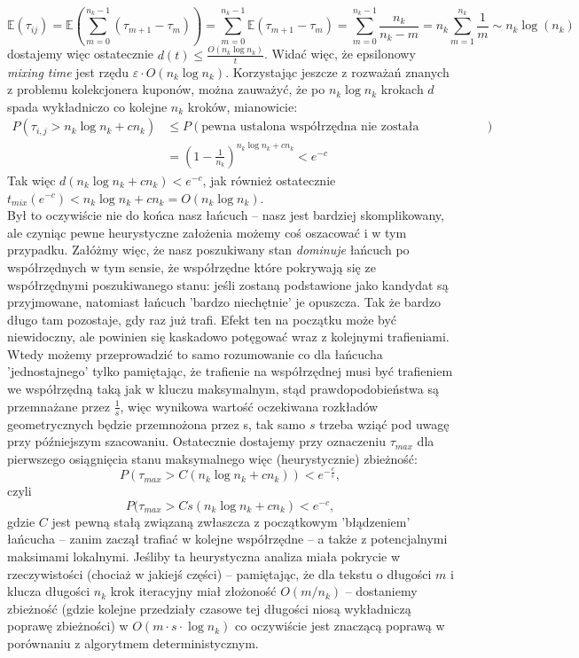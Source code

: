 \documentclass[a4paper]{article}
\theoremstyle{defn}
\theoremstyle{theorem}
\theoremstyle{lemma}
\theoremstyle{cor}
\theoremstyle{fact}
\begin{document}
$$\mathbb{E}(\tau_{ij}) = \mathbb{E}(\sum\limits_{m=0}^{n_k - 1} (\tau_{m+1} - \tau_m)) = \sum\limits_{m=0}^{n_k - 1} \mathbb{E}(\tau_{m+1} - \tau_m) = \sum\limits_{m=0}^{n_k - 1} \frac{n_k}{n_k - m} = n_k \sum\limits_{m=1}^{n_k} \frac{1}{m} \sim n_k \log(n_k)$$
dostajemy więc ostatecznie $d(t) \leq \frac{O(n_k \log n_k)}{t}$. Widać więc, że epsilonowy \textit{mixing time} jest rzędu $\varepsilon \cdot O(n_k \log n_k)$. Korzystając jeszcze z rozważań znanych z problemu kolekcjonera kuponów, można zauważyć, że po $n_k \log n_k$ krokach $d$ spada wykładniczo co kolejne $n_k$ kroków, mianowicie:
\begin{align*}
    P(\tau_{i,j} > n_k \log n_k + cn_k) &\leq P(\text{pewna ustalona współrzędna nie została odwiedzona})\\
    &= (1-\frac{1}{n_k})^{n_k \log n_k + cn_k} < e^{-c}
\end{align*}
Tak więc $d(n_k \log n_k + cn_k) < e^{-c}$, jak również ostatecznie $t_{mix}(e^{-c}) < n_k \log n_k + cn_k = O(n_k \log n_k)$. \\
Był to oczywiście nie do końca nasz łańcuch – nasz jest bardziej skomplikowany, ale czyniąc pewne heurystyczne założenia możemy coś oszacować i w tym przypadku. Załóżmy więc, że nasz poszukiwany stan \textit{dominuje} łańcuch po współrzędnych w tym sensie, że współrzędne które pokrywają się ze współrzędnymi poszukiwanego stanu: jeśli zostaną podstawione jako kandydat są przyjmowane, natomiast łańcuch 'bardzo niechętnie' je opuszcza. Tak że bardzo długo tam pozostaje, gdy raz już trafi. Efekt ten na początku może być niewidoczny, ale powinien się kaskadowo potęgować wraz z kolejnymi trafieniami. Wtedy możemy przeprowadzić to samo rozumowanie co dla łańcucha 'jednostajnego' tylko pamiętając, że trafienie na współrzędnej musi być trafieniem we współrzędną taką jak w kluczu maksymalnym, stąd prawdopodobieństwa są przemnażane przez $\frac{1}{s}$, więc wynikowa wartość oczekiwana rozkładów geometrycznych będzie przemnożona przez s, tak samo $s$ trzeba wziąć pod uwagę przy późniejszym szacowaniu. Ostatecznie dostajemy przy oznaczeniu $\tau_{max}$ dla pierwszego osiągnięcia stanu maksymalnego więc (heurystycznie) zbieżność:
$$P(\tau_{max} > C(n_k \log n_k + cn_k)) < e^{-\frac{c}{s}},$$ 
czyli
$$P(\tau_{max} > Cs(n_k \log n_k + cn_k) < e^{-c},$$ 
gdzie $C$ jest pewną stałą związaną zwłaszcza z początkowym 'błądzeniem' łańcucha – zanim zaczął trafiać w kolejne współrzędne – a także z potencjalnymi maksimami lokalnymi. Jeśliby ta heurystyczna analiza miała pokrycie w rzeczywistości (chociaż w jakiejś części) – pamiętając, że dla tekstu o długości $m$ i klucza długości $n_k$ krok iteracyjny miał złożoność $O(m/n_k)$ – dostaniemy zbieżność (gdzie kolejne przedziały czasowe tej długości niosą wykładniczą poprawę zbieżności) w $O(m \cdot s \cdot \log n_k)$ co oczywiście jest znaczącą poprawą w porównaniu z algorytmem deterministycznym.
\\
\end{document}
